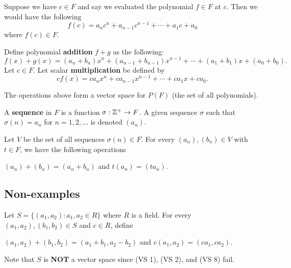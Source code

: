 Suppose we have \( c \in F  \) and say we evaluated the polynomial \( f \in F   \) at \( c  \). Then we would have the following 
\[  f(c) = a_n c^{n} + a_{n-1} c^{n-1} + \cdots + a_{1}c + a_{0} \]
where \( f(c) \in F  \).

\begin{definition}
    Define polynomial \textbf{addition} \( f + g  \) as the following:
        \[  f(x) + g(x) = (a_{n} + b_{n} ) x^{n} + (a_{n-1} + b_{n-1}) x^{n-1} + \cdots + (a_{1} + b_{1})x + (a_{0} + b_{0}). \] Let \( c \in F  \). Let scalar \textbf{multiplication} be defined by 
        \[  c f(x) = ca_n x^{n} + ca_{n-1} x^{n-1} + \cdots + ca_{1}x + ca_{0}. \]
\end{definition}

The operations above form a vector space for \( P(F) \) (the set of all polynomials).

\begin{definition}[Sequences]
    A \textbf{sequence} in \( F  \) is a function \( \sigma : \mathbb{Z}^{+} \to F   \). A given sequence \( \sigma  \) such that \( \sigma (n) = a_{n}  \) for \( n = 1,2,\dots  \) is denoted \( (a_{n}) \).   
\end{definition}

Let \( V  \) be the set of all sequences \( \sigma(n) \in F  \). For every \( (a_{n}), (b_{n} ) \in V  \) with \( t \in F  \), we have the following operations
\begin{center}
        \( (a_{n}) + (b_{n}) = (a_{n} + b_{n}) \) and \( t(a_{n}) = (t a_{n}) \).
\end{center}

\subsection{Non-examples}

\begin{eg}
    Let \( S = \{  (a_{1}, a_{2}) : a_{1} , a_{2} \in R  \}   \) where \( R  \) is a field. For every \( (a_{1} , a_{2}), (b_{1} , b_{2} ) \in S  \) and \( c \in R  \), define 
    \begin{center}
        \( (a_{1}, a_{2} ) + (b_{1}, b_{2}) = (a_{1} + b_{1} , a_{2} - b_{2}) \) and \( c(a_{1}, a_{2}) = (ca_{1}  , ca_{2}) \). 
    \end{center}
    Note that \( S \) is \textbf{NOT} a vector space since  (VS 1), (VS 2), and (VS 8) fail. 
\end{eg}


